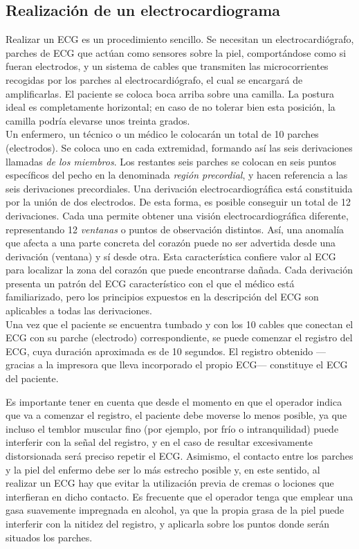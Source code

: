 \documentclass[12pt,letterpaper,oneside,openright]{book}
\begin{document}
\subsection{Realización de un electrocardiograma}

Realizar un ECG es un procedimiento sencillo. Se necesitan un electrocardiógrafo, parches de ECG que actúan como sensores sobre la piel, comportándose como si fueran electrodos, y un sistema de cables que transmiten las microcorrientes recogidas por los parches al electrocardiógrafo, el cual se encargará de amplificarlas. El paciente se coloca boca arriba sobre una camilla. La postura ideal es completamente horizontal; en caso de no tolerar bien esta posición, la camilla podría elevarse unos treinta grados. \\
Un enfermero, un técnico o un médico le colocarán un total de 10 parches (electrodos). Se coloca uno en cada extremidad, formando así las seis derivaciones llamadas \textit{de los miembros}. Los restantes seis parches se colocan en seis puntos específicos del pecho en la denominada \textit{región precordial}, y hacen referencia a las seis derivaciones precordiales. Una derivación electrocardiográfica está constituida por la unión de dos electrodos. De esta forma, es posible conseguir un total de 12 derivaciones. Cada una permite obtener una visión electrocardiográfica diferente, representando 12 \textit{ventanas} o puntos de observación distintos. Así, una anomalía que afecta a una parte concreta del corazón puede no ser advertida desde una derivación (ventana) y sí desde otra. Esta característica confiere valor al ECG para localizar la zona del corazón que puede encontrarse dañada. Cada derivación presenta un patrón del ECG característico con el que el médico está familiarizado, pero los principios expuestos en la descripción del ECG son aplicables a todas las derivaciones. \\
Una vez que el paciente se encuentra tumbado y con los 10 cables que conectan el ECG con su parche (electrodo) correspondiente, se puede comenzar el registro del ECG, cuya duración aproximada es de 10 segundos. El registro obtenido ---gracias a la impresora que lleva incorporado el propio ECG--- constituye el ECG del paciente. 

Es importante tener en cuenta que desde el momento en que el operador indica que va a comenzar el registro, el paciente debe moverse lo menos posible, ya que incluso el temblor muscular fino (por ejemplo, por frío o intranquilidad) puede interferir con la señal del registro, y en el caso de resultar excesivamente distorsionada será preciso repetir el ECG. Asimismo, el contacto entre los parches y la piel del enfermo debe ser lo más estrecho posible y, en este sentido, al realizar un ECG hay que evitar la utilización previa de cremas o lociones que interfieran en dicho contacto. Es frecuente que el operador tenga que emplear una gasa suavemente impregnada en alcohol, ya que la propia grasa de la piel puede interferir con la nitidez del registro, y aplicarla sobre los puntos donde serán situados los parches.
\end{document}
